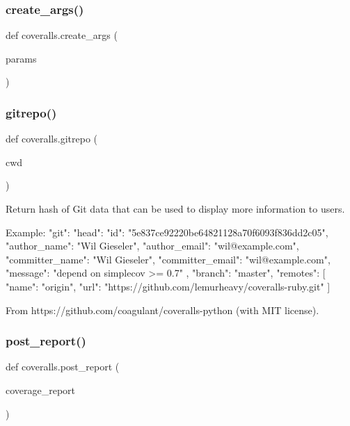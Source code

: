 \subsubsection{\texorpdfstring{create\_args()}{create\_args()}}
{\footnotesize\ttfamily def coveralls.\+create\+\_\+args (\begin{DoxyParamCaption}\item[{}]{params }\end{DoxyParamCaption})}

\mbox{\label{namespacecoveralls_a992d1fafc3eac31f4ec081f4bdb0236e}} 
\subsubsection{\texorpdfstring{gitrepo()}{gitrepo()}}
{\footnotesize\ttfamily def coveralls.\+gitrepo (\begin{DoxyParamCaption}\item[{}]{cwd }\end{DoxyParamCaption})}

\begin{DoxyVerb}Return hash of Git data that can be used to display more information to
users.

Example:
    "git": {
        "head": {
            "id": "5e837ce92220be64821128a70f6093f836dd2c05",
            "author_name": "Wil Gieseler",
            "author_email": "wil@example.com",
            "committer_name": "Wil Gieseler",
            "committer_email": "wil@example.com",
            "message": "depend on simplecov >= 0.7"
        },
        "branch": "master",
        "remotes": [{
            "name": "origin",
            "url": "https://github.com/lemurheavy/coveralls-ruby.git"
        }]
    }

From https://github.com/coagulant/coveralls-python (with MIT license).
\end{DoxyVerb}
 \mbox{\label{namespacecoveralls_a4637803ef83594232aa5a5c1e6171e87}} 
\subsubsection{\texorpdfstring{post\_report()}{post\_report()}}
{\footnotesize\ttfamily def coveralls.\+post\+\_\+report (\begin{DoxyParamCaption}\item[{}]{coverage\+\_\+report }\end{DoxyParamCaption})}

